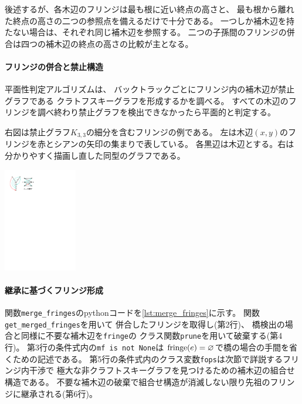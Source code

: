 後述するが、各木辺のフリンジは最も根に近い終点の高さと、
最も根から離れた終点の高さの二つの参照点を備えるだけで十分である。
一つしか補木辺を持たない場合は、それぞれ同じ補木辺を参照する。
二つの子孫間のフリンジの併合は四つの補木辺の終点の高さの比較が主となる。


\begin{paracol}{2}
\paragraph{フリンジの併合と禁止構造}
平面性判定アルゴリズムは、
バックトラックごとにフリンジ内の補木辺が禁止グラフである
クラトフスキーグラフを形成するかを調べる。
すべての木辺のフリンジを調べ終わり禁止グラフを検出できなかったら平面的と判定する。

右図は禁止グラフ$K_{3,3}$の細分を含むフリンジの例である。
左は木辺$(x,y)$のフリンジを赤とシアンの矢印の集まりで表している。
各黒辺は木辺とする。右は分かりやすく描画し直した同型のグラフである。

\switchcolumn
\vspace{1.\intextsep}
\centering
\includegraphics[width=0.24\textwidth]{figures/forbidden_fringe1.pdf}
\end{paracol}




\paragraph{継承に基づくフリンジ形成}
関数{\tt merge\_fringes}のpythonコードを\lstrefname\ref{lst:merge_fringes}に示す。
関数{\tt get\_merged\_fringes}を用いて
併合したフリンジを取得し(第2行)、
橋検出の場合と同様に不要な補木辺を{\tt fringe}の
クラス関数{\tt prune}を用いて破棄する(第4行)。
第3行の条件式内の{\tt mf is not None}は
$\operatorname{fringe}(e)=\varnothing$で橋の場合の手間を省くための記述である。
第5行の条件式内のクラス変数{\tt fops}は次節で詳説するフリンジ内干渉で
極大な非クラフトスキーグラフを見つけるための補木辺の組合せ構造である。
不要な補木辺の破棄で組合せ構造が消滅しない限り先祖のフリンジに継承される(第6行)。

